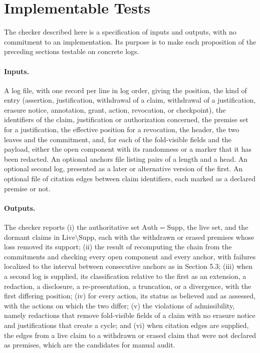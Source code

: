 \documentclass[11pt]{article}
\theoremstyle{plain}
\theoremstyle{definition}
\theoremstyle{remark}
\begin{document}
\section{Implementable Tests}
The checker described here is a specification of inputs and outputs, with no commitment to an implementation. Its purpose is to make each proposition of the preceding sections testable on concrete logs.

\paragraph{Inputs.} A log file, with one record per line in log order, giving the position, the kind of entry (assertion, justification, withdrawal of a claim, withdrawal of a justification, erasure notice, annotation, grant, action, revocation, or checkpoint), the identifiers of the claim, justification or authorization concerned, the premise set for a justification, the effective position for a revocation, the header, the two leaves and the commitment, and, for each of the fold-visible fields and the payload, either the open component with its randomness or a marker that it has been redacted. An optional anchors file listing pairs of a length and a head. An optional second log, presented as a later or alternative version of the first. An optional file of citation edges between claim identifiers, each marked as a declared premise or not.

\paragraph{Outputs.} The checker reports (i) the authoritative set $\mathrm{Auth}=\mathrm{Supp}$, the live set, and the dormant claims in $\mathrm{Live}\setminus\mathrm{Supp}$, each with the withdrawn or erased premises whose loss removed its support; (ii) the result of recomputing the chain from the commitments and checking every open component and every anchor, with failures localized to the interval between consecutive anchors as in Section 5.3; (iii) when a second log is supplied, its classification relative to the first as an extension, a redaction, a disclosure, a re-presentation, a truncation, or a divergence, with the first differing position; (iv) for every action, its status as believed and as assessed, with the actions on which the two differ; (v) the violations of admissibility, namely redactions that remove fold-visible fields of a claim with no erasure notice and justifications that create a cycle; and (vi) when citation edges are supplied, the edges from a live claim to a withdrawn or erased claim that were not declared as premises, which are the candidates for manual audit.
\end{document}
